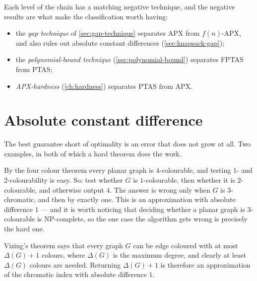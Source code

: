 Each level of the chain has a matching negative technique, and the negative
results are what make the classification worth having:
\begin{itemize}[leftmargin=*,nosep]
  \item the \emph{gap technique} of \cref{sec:gap-technique} separates
        \textrm{APX} from $f(n)$-APX, and also rules out absolute constant
        differences (\cref{sec:knapsack-gap});
  \item the \emph{polynomial-bound technique} (\cref{sec:polynomial-bound})
        separates FPTAS from PTAS;
  \item \emph{APX-hardness} (\cref{ch:hardness}) separates PTAS from
        \textrm{APX}.
\end{itemize}

\section{Absolute constant difference}
\label{sec:absolute-difference}

The best guarantee short of optimality is an error that does not grow at all.
Two examples, in both of which a hard theorem does the work.

\begin{example}\label{ex:planar-colouring}
By the four colour theorem every planar graph is $4$-colourable, and testing
$1$- and $2$-colourability is easy. So: test whether $G$ is $1$-colourable, then
whether it is $2$-colourable, and otherwise output $4$. The answer is wrong only
when $G$ is $3$-chromatic, and then by exactly one. This is an approximation
with absolute difference $1$ --- and it is worth noticing that deciding whether
a planar graph is $3$-colourable is \textrm{NP}-complete, so the one case the
algorithm gets wrong is precisely the hard one.
\end{example}

\begin{example}\label{ex:vizing}
Vizing's theorem says that every graph $G$ can be edge coloured with at most
$\Delta(G)+1$ colours, where $\Delta(G)$ is the maximum degree, and clearly at
least $\Delta(G)$ colours are needed. Returning $\Delta(G)+1$ is therefore an
approximation of the chromatic index with absolute difference $1$.
\end{example}

